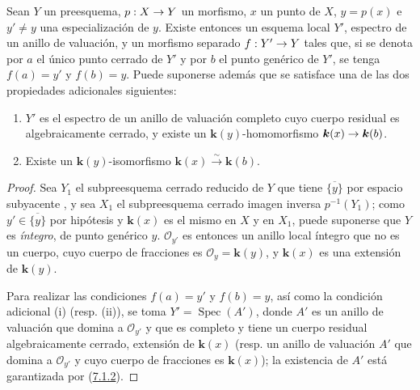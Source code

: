 \documentclass[oneside,10pt]{amsart}
\makeatletter
\newcommand{\ega@arrow}[2]{\mathchoice{#1}{#2}{#2}{#2}}
\renewcommand{\to}{\ega@arrow{\longrightarrow}{\rightarrow}}
\let\EGAOriginalLabel\label
\renewcommand{\label}[1]{\phantomsection\EGAOriginalLabel{#1}}
\makeatother
\begin{document}
\begin{proposition}[7.1.4]
\label{II.7.1.4-fr}
Sean $Y$ un preesquema, $p:X\to Y$ un morfismo, $x$ un punto de $X$, $y=p(x)$ e $y'\neq y$ una especialización  de $y$.
Existe entonces un esquema local $Y'$, espectro de un anillo de valuación, y un morfismo separado $f:Y'\to Y$ tales que, si se denota por $a$ el único punto cerrado de $Y'$ y por $b$ el punto genérico de $Y'$, se tenga
$f(a)=y'$ y $f(b)=y$.
Puede suponerse además que se satisface una de las dos propiedades adicionales siguientes:
\begin{enumerate}
  \item[\rm{(i)}] $Y'$ es el espectro de un anillo de valuación completo cuyo cuerpo residual es algebraicamente cerrado, y existe un $\boldsymbol{k}(y)$-homomorfismo $\boldsymbol{k}(x)\to \boldsymbol{k}(b)$.
  \item[\rm{(ii)}] Existe un $\boldsymbol{k}(y)$-isomorfismo $\boldsymbol{k}(x)\xrightarrow{\sim}\boldsymbol{k}(b)$.
\end{enumerate}
\end{proposition}

\begin{proof}
Sea $Y_1$ el subpreesquema cerrado reducido de $Y$ que tiene $\overline{\{y\}}$ por espacio subyacente , y sea $X_1$ el subpreesquema cerrado imagen inversa $p^{-1}(Y_1)$;
como $y'\in\overline{\{y\}}$ por hipótesis y $\boldsymbol{k}(x)$ es el mismo en $X$ y en $X_1$, puede suponerse que $Y$ es \emph{íntegro}, de punto genérico $y$.
$\mathcal{O}_{y'}$ es entonces un anillo local íntegro que no es un cuerpo, cuyo cuerpo de fracciones es $\mathcal{O}_y=\boldsymbol{k}(y)$, y $\boldsymbol{k}(x)$ es una extensión de $\boldsymbol{k}(y)$.

Para realizar las condiciones $f(a)=y'$ y $f(b)=y$, así como la condición adicional (i) (resp. (ii)), se toma $Y'=\operatorname{Spec}(A')$, donde $A'$ es un anillo de valuación que domina a $\mathcal{O}_{y'}$ y que es completo y tiene un cuerpo residual algebraicamente cerrado, extensión de $\boldsymbol{k}(x)$ (resp. un anillo de valuación $A'$ que domina a $\mathcal{O}_{y'}$ y cuyo cuerpo de fracciones es $\boldsymbol{k}(x)$); la existencia de $A'$ está garantizada por (\hyperref[II.7.1.2-fr]{7.1.2}).

\end{proof}
\end{document}
